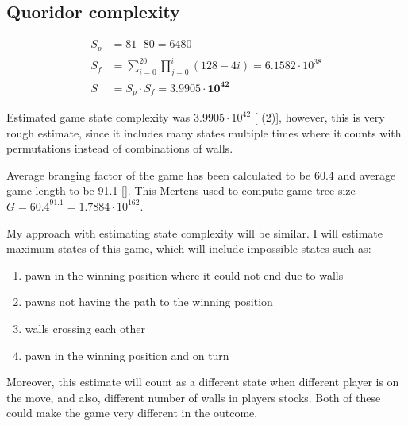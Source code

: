 \documentclass[12pt, oneside]{book}
\begin{document}
  \subsection{Quoridor complexity}
    \begin{figure}
      \vspace*{-1.45cm}
      \begin{equation}
        \label{eqn:mertensestimate}
        \begin{aligned}
          S_p &= 81 \cdot 80 = 6480
          \\
          S_f &= \sum_{i=0}^{20}\prod_{j=0}^{i}(128 - 4i)= 6.1582{\cdot}10^{38}
          \\
          S &= S_p \cdot S_f = \mathbf{3.9905 \cdot 10 ^{42}}
        \end{aligned}
      \end{equation}
      \vspace*{-1.45cm}
    \end{figure}

    Estimated game state complexity was $3.9905\cdot10^{42}$
    [\cite{mertens} (2)], however, this is very rough estimate, since it
    includes many states multiple times where it counts with permutations
    instead of combinations of walls.

    Average branging factor of the game has been calculated to be 60.4 and
    average game length to be 91.1 [\cite{glendenning}]. This Mertens used to
    compute game-tree size $G = 60.4^{91.1} = 1.7884{\cdot}10^{162}$.

    My approach with estimating state complexity will be similar. I will
    estimate maximum states of this game, which will include impossible states
    such as:
    \begin{enumerate}[topsep=0pt,itemsep=-1ex,partopsep=1ex,parsep=1ex]
      \setlength\itemsep{0em}
      \item pawn in the winning position where it could not end due to walls
      \item pawns not having the path to the winning position
      \item walls crossing each other
      \item pawn in the winning position and on turn
    \end{enumerate}
    Moreover, this estimate will count as a different state when different
    player is on the move, and also, different number of walls in players
    stocks. Both of these could make the game very different in the outcome.
\end{document}
